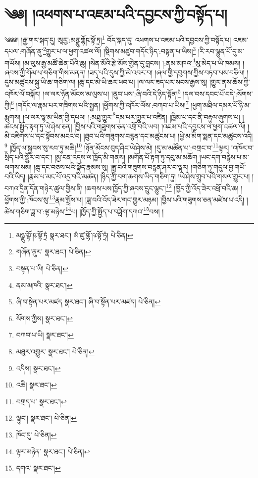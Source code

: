 \setcounter{footnote}{0} 
\chapter{༄༅། །འཕགས་པ་འཇམ་པའི་དབྱངས་ཀྱི་བསྟོད་པ།}༄༅༅། །རྒྱ་གར་སྐད་དུ། ཨཱརྱ་:མཉྫུ་གྷོཥ་སྟོ་ཏྲ།\footnote{མཉྫུ་གྷོ་ཥ་སྟོ་ཏྲཾ  སྣར་ཐང་། མཾ་ཛུ་གྷོ་ཥ་སྟོ་ཏྲཾ།  པེ་ཅིན། } བོད་སྐད་དུ། འཕགས་པ་འཇམ་པའི་དབྱངས་ཀྱི་བསྟོད་པ། འཇམ་དཔལ་:གཞོན་ནུ་\footnote{གཞོན་ནུར་  སྣར་ཐང་།  པེ་ཅིན། }གྱུར་པ་ལ་ཕྱག་འཚལ་ལོ། །སྡིགས་མཛུབ་གདོང་ཉིད་:བསྟན་པ་ཡིས།\footnote{བསྟན་པ་ཡི།  པེ་ཅིན། } །རི་རབ་ལྷུན་པོ་དུ་མ་གཡོས། །མ་ལུས་རྒྱ་མཚོ་ཆེན་པོའི་ཆུ། །སེན་མོའི་རྩེ་མོས་གྱེན་དུ་བླངས། །:ནམ་མཁའ་\footnote{ནམ་མཁའི་  སྣར་ཐང་། }མུ་མེད་པ་ཡི་ཁམས། །ཞབས་ཀྱི་གོམ་པ་གཅིག་གིས་མནན། །ཟད་པའི་དུས་ཀྱི་མེ་འབར་བ། །ཞལ་གྱི་དབུགས་ཀྱིས་བཏབ་པས་བཅིལ། །དུས་མཚུངས་སྐུ་ཡི་ཆ་གཅིག་ལ། །ཆུ་དང་མེ་ཡི་ཆར་ཕབ་པ། །ལ་ལར་ཟད་པར་སངས་རྒྱས་སུ། །གྱུར་ནས་ཆོས་ཀྱི་འཁོར་ལོ་བསྐོར། །ལ་ལར་ཉོན་མོངས་མ་ལུས་པ། །ནུབ་པས་:ཞི་བའི་དེ་ཉིད་སྟོན།\footnote{ཞི་བ་སྟེན་པར་མཛད  སྣར་ཐང་། ཞི་བ་སྟོན་པར་མཛད།  པེ་ཅིན། } །དལ་བས་དབང་པོ་བདེ་:སོགས་ཀྱི།\footnote{སོགས་ཀྱིས།  སྣར་ཐང་། } །གདོང་ལ་རྣམ་པར་གཟིགས་པའི་སྤྱན། །ཕྱོགས་ཀྱི་འཁོར་ལོས་:བཀབ་པ་ཡིས།\footnote{བཀབ་པ་ཡི།  སྣར་ཐང་། } །ཕྱག་མཐིལ་དམར་པོ་ཉི་མ་རྨུགས། །ལ་ལར་ལྷ་མ་ཡིན་གྱི་དཔལ། །:མཐུ་གྱུར་\footnote{མཐུར་འགྱུར་  སྣར་ཐང་།  པེ་ཅིན། }དམ་པར་གྱུར་པ་འཛིན། །ཁྱིམ་པ་དང་ནི་བརྟུལ་ཞུགས་པ། །ཚངས་སྤྱོད་རྟག་ཏུ་ཡེ་ཤེས་ཅན། །བྱིས་པའི་གཟུགས་ཅན་འགྲོ་བའི་ཡབ། །འཇམ་པའི་དབྱངས་ལ་ཕྱག་འཚལ་ལོ། །མི་འཇིགས་པ་དང་སྟོབས་མངའ་བ། །ཐུབ་པའི་གཟུགས་བརྙན་དང་མཚུངས་པ། །ཕྱེ་མ་མིག་སྨན་དང་མཚུངས་འདི།\footnote{འདིས།  སྣར་ཐང་། } །ཁྱོད་ལ་སྐྱབས་སུ་རབ་ཏུ་མཆི།\footnote{འཆི།  སྣར་ཐང་། } །ཉོན་མོངས་བུད་ཤིང་ཡེ་ཤེས་མེ། །དུ་མ་མཚོན་པ་:བགྲང་བ་\footnote{བགྲད་པ་  སྣར་ཐང་། }ལྟར། །འཁོར་བ་སྲིད་པའི་སྦྱོར་བ་དང་། །མྱ་ངན་འདས་ལ་ཁྱོད་མི་གནས། །མགོན་པོ་རྟག་ཏུ་དབུ་མ་མཆོག །ཡང་དག་བརྙེས་པ་མ་ལགས་སམ། །ཆུ་དང་བཅས་པའི་སྣོད་རྣམས་སུ། །ཟླ་བའི་གཟུགས་བརྙན་ཤར་བ་ལྟར། །གཅིག་ཏུ་གདུལ་བྱ་གཡོ་བའི་ཡིད། །རྣམ་པ་མང་པོ་འདྲ་བའི་མཚན། །ཉིད་ཀྱི་བག་ཆགས་ཡིད་གཅིག་ཏུ། །ཡེ་ཤེས་གྲུབ་པའི་གསལ་གྱུར་པ། །བཀའ་དྲིན་དོན་གཉེར་ཚུལ་གྱིས་ནི། །ཆགས་པས་ཁྱོད་ཀྱི་ཞབས་དྲུང་ལྷུང་།\footnote{ལྟུང་།  སྣར་ཐང་།  པེ་ཅིན། } །ཁྱོད་ཀྱི་འོད་ཟེར་འཕྲོ་བའི་ཆ། །ཕྱོགས་ཀྱི་:ཁོངས་སུ་\footnote{ཁོང་དུ་  པེ་ཅིན། }རྣམ་སྤྲོས་པ། །ཟླ་བའི་འོད་ཟེར་གང་གྱུར་མཉམ། །བྱིས་པའི་གཟུགས་ཅན་མཛེས་པ་འདི། །ཚེས་གཅིག་ཟླ་བ་:ལྟ་མཉེས་\footnote{ལྟར་མཉེན་  སྣར་ཐང་།  པེ་ཅིན། }པ། །ཁྱོད་ཀྱི་སྤྱོད་པ་བཟློག་དཀའ་\footnote{དགའ་  སྣར་ཐང་། }བས། །

